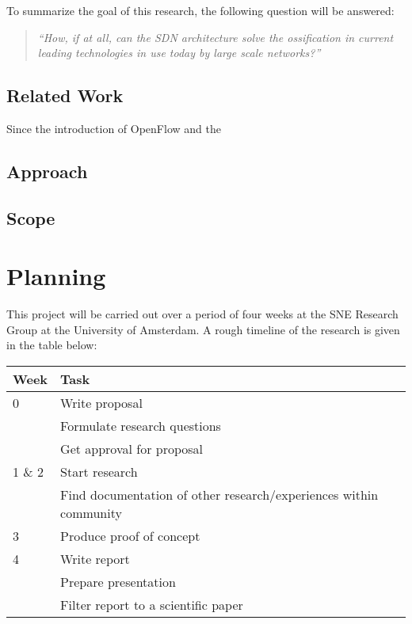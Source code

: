 \documentclass[oneside,twocolumn,8pt,a4paper]{article}
\begin{document}
			
		To summarize the goal of this research, the following question will be answered:
		\begin{quote}
			\textsl{``How, if at all, can the SDN architecture solve the ossification in current leading technologies in use today by large scale networks?''}
		\end{quote}
			
		\subsection*{Related Work} %
		\label{sub:related_work}
		Since the introduction of OpenFlow and the 
		
		\subsection*{Approach} %
		\label{sub:approach}
		

		\subsection*{Scope} %
		\label{sub:scope}
			

	
	\section{Planning} %
	\label{sec:planning}
		This project will be carried out over a period of four weeks at the SNE Research Group at the University of Amsterdam. A rough timeline of the research is given in the table below: \\
		
		\begin{tabular}{l p{5.8cm}}
			Week & Task \\ \hline
				0 & Write proposal\\
					& Formulate research questions\\
					& Get approval for proposal \\ \hline
				1 \& 2 & Start research\\ 
					& Find documentation of other research/experiences within community \\ \hline
				3 & Produce proof of concept\\  \hline
				4 & Write report\\ 
					& Prepare presentation\\
					& Filter report to a scientific paper \\
		\end{tabular}
		
\end{document}
